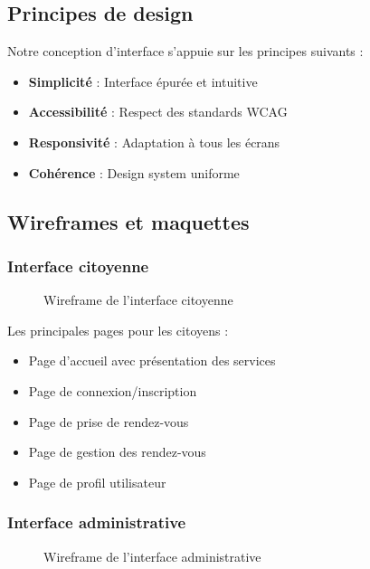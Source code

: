 \subsection{Principes de design}

Notre conception d'interface s'appuie sur les principes suivants :
\begin{itemize}
    \item \textbf{Simplicité} : Interface épurée et intuitive
    \item \textbf{Accessibilité} : Respect des standards WCAG
    \item \textbf{Responsivité} : Adaptation à tous les écrans
    \item \textbf{Cohérence} : Design system uniforme
\end{itemize}

\subsection{Wireframes et maquettes}

\subsubsection{Interface citoyenne}

\begin{figure}[h]
    \centering
    \caption{Wireframe de l'interface citoyenne}
    \label{fig:citizen_wireframe}
\end{figure}

Les principales pages pour les citoyens :
\begin{itemize}
    \item Page d'accueil avec présentation des services
    \item Page de connexion/inscription
    \item Page de prise de rendez-vous
    \item Page de gestion des rendez-vous
    \item Page de profil utilisateur
\end{itemize}

\subsubsection{Interface administrative}

\begin{figure}[h]
    \centering
    \caption{Wireframe de l'interface administrative}
    \label{fig:admin_wireframe}
\end{figure}

